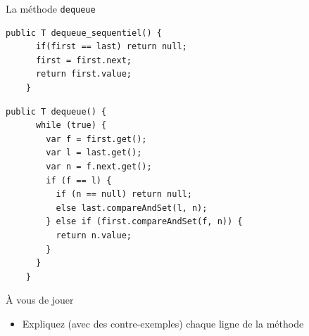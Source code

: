 
\begingroup

\begin{frame}[fragile]{La méthode \lstinline{dequeue}}

  \begin{lstlisting}[gobble=4]
    public T dequeue_sequentiel() {
      if(first == last) return null;
      first = first.next;
      return first.value;
    }
  \end{lstlisting}

  \begin{lstlisting}[gobble=4]
    public T dequeue() {
      while (true) {
        var f = first.get();
        var l = last.get();
        var n = f.next.get();
        if (f == l) {
          if (n == null) return null;
          else last.compareAndSet(l, n);
        } else if (first.compareAndSet(f, n)) {
          return n.value;
        }
      }
    }
  \end{lstlisting}
  
  \begin{exampleblock}{À vous de jouer}
    \begin{itemize}
    \item Expliquez (avec des contre-exemples) chaque ligne de la méthode 
    \end{itemize}
  \end{exampleblock}
  
\end{frame}

\endgroup
\endinput

